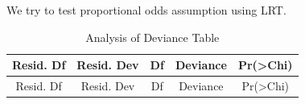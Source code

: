 \documentclass[]{book}
\newenvironment{Shaded}{\begin{snugshade}}{\end{snugshade}}
\newcommand{\DataTypeTok}[1]{\textcolor[rgb]{0.13,0.29,0.53}{#1}}
\newcommand{\DecValTok}[1]{\textcolor[rgb]{0.00,0.00,0.81}{#1}}
\newcommand{\KeywordTok}[1]{\textcolor[rgb]{0.13,0.29,0.53}{\textbf{#1}}}
\newcommand{\NormalTok}[1]{#1}
\newcommand{\OperatorTok}[1]{\textcolor[rgb]{0.81,0.36,0.00}{\textbf{#1}}}
\newcommand{\OtherTok}[1]{\textcolor[rgb]{0.56,0.35,0.01}{#1}}
\newcommand{\StringTok}[1]{\textcolor[rgb]{0.31,0.60,0.02}{#1}}
\begin{document}
We try to test proportional odds assumption using LRT.

\begin{Shaded}
\end{Shaded}

\begin{longtable}[]{@{}ccccc@{}}
\caption{Analysis of Deviance Table}\tabularnewline
\toprule
\begin{minipage}[b]{0.14\columnwidth}\centering
Resid. Df\strut
\end{minipage} & \begin{minipage}[b]{0.16\columnwidth}\centering
Resid. Dev\strut
\end{minipage} & \begin{minipage}[b]{0.06\columnwidth}\centering
Df\strut
\end{minipage} & \begin{minipage}[b]{0.13\columnwidth}\centering
Deviance\strut
\end{minipage} & \begin{minipage}[b]{0.13\columnwidth}\centering
Pr(\textgreater{}Chi)\strut
\end{minipage}\tabularnewline
\midrule
\endfirsthead
\toprule
\begin{minipage}[b]{0.14\columnwidth}\centering
Resid. Df\strut
\end{minipage} & \begin{minipage}[b]{0.16\columnwidth}\centering
Resid. Dev\strut
\end{minipage} & \begin{minipage}[b]{0.06\columnwidth}\centering
Df\strut
\end{minipage} & \begin{minipage}[b]{0.13\columnwidth}\centering
Deviance\strut
\end{minipage} & \begin{minipage}[b]{0.13\columnwidth}\centering
Pr(\textgreater{}Chi)\strut
\end{minipage}\tabularnewline
\midrule

\end{longtable}
\end{document}

